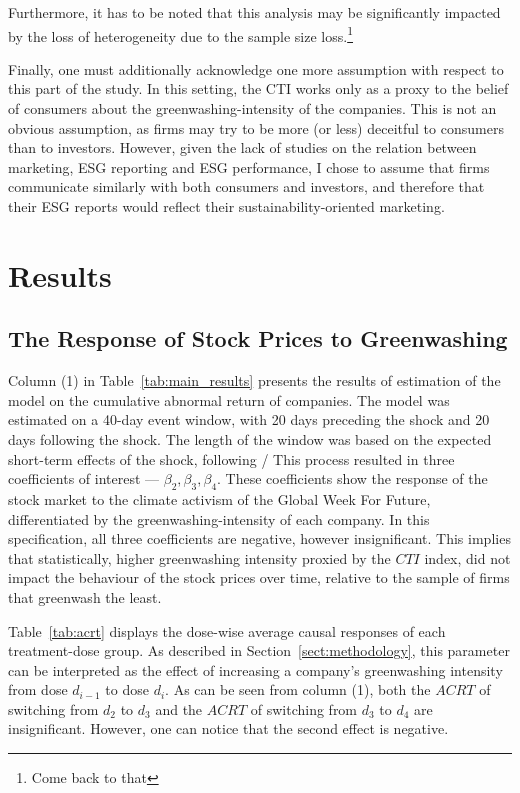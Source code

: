 \documentclass[12pt]{article}
\begin{document}
Furthermore, it has to be noted that this analysis may be significantly impacted by the loss of heterogeneity due to the sample size loss.\footnote{Come back to that}

Finally, one must additionally acknowledge one more assumption with respect to this part of the study. In this setting, the CTI works only as a proxy to the belief of consumers about the greenwashing-intensity of the companies. This is not an obvious assumption, as firms may try to be more (or less) deceitful to consumers than to investors. However, given the lack of studies on the relation between marketing, ESG reporting and ESG performance, I chose to assume that firms communicate similarly with both consumers and investors, and therefore that their ESG reports would reflect their sustainability-oriented marketing. 


\section{Results}\label{sect:results}


\subsection{The Response of Stock Prices to Greenwashing}

Column (1) in Table~\ref{tab:main_results} presents the results of estimation of the model on the cumulative abnormal return of companies. The model was estimated on a 40-day event window, with 20 days preceding the shock and 20 days following the shock. The length of the window was based on the expected short-term effects of the shock, following \textcite{schusterStockPriceReactions2023}/ This process resulted in three coefficients of interest --- $\beta_2, \beta_3, \beta_4$. These coefficients show the response of the stock market to the climate activism of the Global Week For Future, differentiated by the greenwashing-intensity of each company. In this specification, all three coefficients are negative, however insignificant. This implies that statistically, higher greenwashing intensity proxied by the $CTI$ index, did not impact the behaviour of the stock prices over time, relative to the sample of firms that greenwash the least. 

Table~\ref{tab:acrt} displays the dose-wise average causal responses of each treatment-dose group. As described in Section~\ref{sect:methodology}, this parameter can be interpreted as the effect of increasing a company's greenwashing intensity from dose $d_{i-1}$ to dose $d_i$. As can be seen from column (1), both the $ACRT$ of switching from $d_2$ to $d_3$ and the  $ACRT$ of switching from $d_3$ to $d_4$ are insignificant. However, one can notice that the second effect is negative. 
\end{document}

